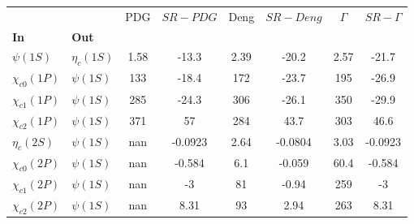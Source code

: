 \begin{tabular}{l|l|c|c|c|c|c|c}
\toprule
                &            &  PDG & $SR-PDG$ &  Deng & $SR-Deng$ &  $\Gamma$ & $SR-\Gamma$ \\
\textbf{In} & \textbf{Out} &      &          &       &           &           &             \\
\midrule
\textbf{$\psi(1S)$} & \textbf{$\eta_{c}(1S)$} & 1.58 &    -13.3 &  2.39 &     -20.2 &      2.57 &       -21.7 \\
\textbf{$\chi_{c0}(1P)$} & \textbf{$\psi(1S)$} &  133 &    -18.4 &   172 &     -23.7 &       195 &       -26.9 \\
\textbf{$\chi_{c1}(1P)$} & \textbf{$\psi(1S)$} &  285 &    -24.3 &   306 &     -26.1 &       350 &       -29.9 \\
\textbf{$\chi_{c2}(1P)$} & \textbf{$\psi(1S)$} &  371 &       57 &   284 &      43.7 &       303 &        46.6 \\
\textbf{$\eta_{c}(2S)$} & \textbf{$\psi(1S)$} &  nan &  -0.0923 &  2.64 &   -0.0804 &      3.03 &     -0.0923 \\
\textbf{$\chi_{c0}(2P)$} & \textbf{$\psi(1S)$} &  nan &   -0.584 &   6.1 &    -0.059 &      60.4 &      -0.584 \\
\textbf{$\chi_{c1}(2P)$} & \textbf{$\psi(1S)$} &  nan &       -3 &    81 &     -0.94 &       259 &          -3 \\
\textbf{$\chi_{c2}(2P)$} & \textbf{$\psi(1S)$} &  nan &     8.31 &    93 &      2.94 &       263 &        8.31 \\
\bottomrule
\end{tabular}
